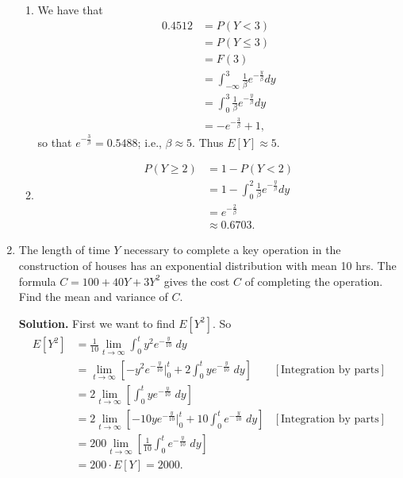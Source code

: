 \documentclass[9pt]{article}
\begin{document}
\begin{enumerate}
      \begin{enumerate}
         \item We have that
               \begin{align*}
                  0.4512 &= P(Y < 3) \\
                         &= P(Y \le 3) \\
                         &= F(3) \\
                         &= \int_{-\infty}^3\frac{1}{\beta}
                            e^{-\frac{y}{\beta}} dy \\
                         &= \int_0^3\frac{1}{\beta}
                            e^{-\frac{y}{\beta}} dy \\
                         &= -e^{-\frac{3}{\beta}} + 1,
               \end{align*}
               so that $e^{-\frac{3}{\beta}} = 0.5488$; i.e., $\beta \approx 5$.
               Thus $E[Y] \approx 5$.
         \item \begin{align*}
                  P(Y \ge 2) &= 1 - P(Y < 2) \\
                     &= 1 - \int_0^2\frac{1}{\beta}e^{-\frac{y}{\beta}} dy \\
                     &= e^{-\frac{2}{\beta}} \\
                     &\approx 0.6703.
               \end{align*}
      \end{enumerate}
   \item The length of time $Y$ necessary to complete a key operation in the
         construction of houses has an exponential distribution with mean 10
         hrs. The formula $C = 100 + 40Y + 3Y^2$ gives the cost $C$ of
         completing the operation. Find the mean and variance of $C$.
      
      \textbf{Solution.} First we want to find $E[Y^2]$. So
      \begin{align*}
         E[Y^2] &= \frac{1}{10}\lim_{t\rightarrow\infty}\int_0^t y^2
                   e^{-\frac{y}{10}}\;dy \\
            &= \lim_{t\rightarrow\infty}\left[-y^2e^{-\frac{y}{10}}\Big|_0^t +
               2\int_0^t y e^{-\frac{y}{10}}\;dy\right]
               &[\text{Integration by parts}] \\
            &= 2\lim_{t\rightarrow\infty}\left[\int_0^t y e^{-\frac{y}{10}}\;dy
               \right] \\
            &= 2\lim_{t\rightarrow\infty}\left[-10ye^{-\frac{y}{10}}\Big|_0^t +
               10\int_0^t e^{-\frac{y}{10}}\;dy
               \right] &[\text{Integration by parts}] \\
            &= 200\lim_{t\rightarrow\infty}\left[\frac{1}{10}\int_0^t
               e^{-\frac{y}{10}}\;dy \right] \\
            &= 200 \cdot E[Y] = 2000.
      \end{align*}         


\end{enumerate}
\end{document}
